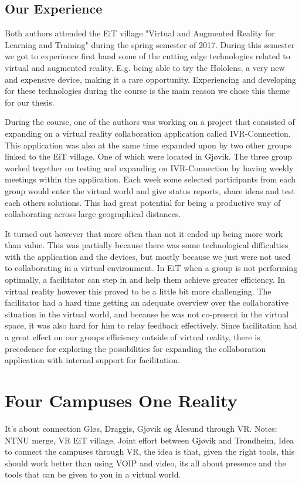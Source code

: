         \subsection{Our Experience}
        Both authors attended the EiT village "Virtual and Augmented Reality for Learning and Training" during the spring semester of 2017. During this semester we got to experience first hand some of the cutting edge technologies related to virtual and augmented reality. E.g. being able to try the Hololens, a very new and expensive device, making it a rare opportunity. Experiencing and developing for these technologies during the course is the main reason we chose this theme for our thesis.
        
        During the course, one of the authors was working on a project that consisted of expanding on a virtual reality collaboration application called IVR-Connection. This application was also at the same time expanded upon by two other groups linked to the EiT village. One of which were located in Gjøvik. The three group worked together on testing and expanding on IVR-Connection by having weekly meetings within the application. Each week some selected participants from each group would enter the virtual world and give status reports, share ideas and test each others solutions. This had great potential for being a productive way of collaborating across large geographical distances.
        
        It turned out however that more often than not it ended up being more work than value. This was partially because there was some technological difficulties with the application and the devices, but mostly because we just were not used to collaborating in a virtual environment. In EiT when a group is not performing optimally, a facilitator can step in and help them achieve greater efficiency. In virtual reality however this proved to be a little bit more challenging. The facilitator had a hard time getting an adequate overview over the collaborative situation in the virtual world, and because he was not co-present in the virtual space, it was also hard for him to relay feedback effectively. Since facilitation had a great effect on our groups efficiency outside of virtual reality, there is precedence for exploring the possibilities for expanding the collaboration application with internal support for facilitation.
        
    \section{Four Campuses One Reality}
    It's about connection Gløs, Draggis, Gjøvik og Ålesund through VR.
    Notes: NTNU merge, VR EiT village, Joint effort between Gjøvik and Trondheim, Idea to connect the campuses through VR, the idea is that, given the right tools, this should work better than using VOIP and video, its all about presence and the tools that can be given to you in a virtual world.
    
